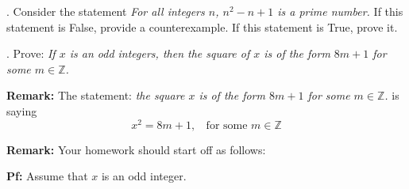 \documentclass[12pt]{article}
\begin{document}
.  Consider the statement \textit{For all integers $n$, $n^{2} - n + 1$ is a prime number.  }  If this statement is False, provide a counterexample.  If this statement is True, prove it.  
\vspace{.15in}

.  Prove: \textit{If $x$ is an odd integers, then the square of $x$ is of the form $8m + 1$ for some $m \in \mathbb{Z}$.}
\vspace{.05in}

\noindent \textbf{Remark:}  The statement: \textit{ the square $x$ is of the form $8m + 1$ for some $m \in \mathbb{Z}$.} is saying 
\[
x^{2} = 8m + 1, \;\; \mbox{ for some } m \in \mathbb{Z}
\]


\noindent \textbf{Remark:} Your homework should start off as follows:
\vspace{.05in}

\noindent \textbf{Pf:}  Assume that $x$ is an odd integer.   
\vspace{.15in}
\end{document}
